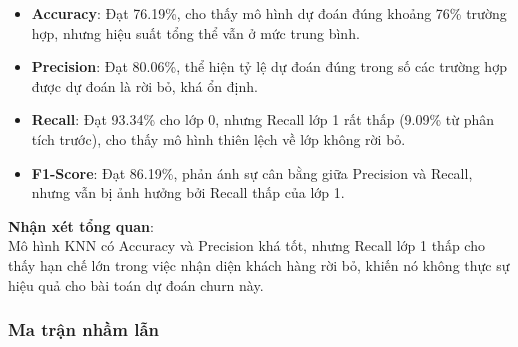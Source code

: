 \documentclass[
]{article}
\newenvironment{Shaded}{\begin{snugshade}}{\end{snugshade}}
\newcommand{\AttributeTok}[1]{\textcolor[rgb]{0.13,0.29,0.53}{#1}}
\newcommand{\FunctionTok}[1]{\textcolor[rgb]{0.13,0.29,0.53}{\textbf{#1}}}
\newcommand{\NormalTok}[1]{#1}
\newcommand{\OtherTok}[1]{\textcolor[rgb]{0.56,0.35,0.01}{#1}}
\newcommand{\SpecialCharTok}[1]{\textcolor[rgb]{0.81,0.36,0.00}{\textbf{#1}}}
\newcommand{\StringTok}[1]{\textcolor[rgb]{0.31,0.60,0.02}{#1}}
\providecommand{\tightlist}{%
  \setlength{\itemsep}{0pt}\setlength{\parskip}{0pt}}
\begin{document}
\begin{itemize}
\tightlist
\item
  \textbf{Accuracy}: Đạt 76.19\%, cho thấy mô hình dự đoán đúng khoảng
  76\% trường hợp, nhưng hiệu suất tổng thể vẫn ở mức trung bình.
\item
  \textbf{Precision}: Đạt 80.06\%, thể hiện tỷ lệ dự đoán đúng trong số
  các trường hợp được dự đoán là rời bỏ, khá ổn định.
\item
  \textbf{Recall}: Đạt 93.34\% cho lớp 0, nhưng Recall lớp 1 rất thấp
  (9.09\% từ phân tích trước), cho thấy mô hình thiên lệch về lớp không
  rời bỏ.
\item
  \textbf{F1-Score}: Đạt 86.19\%, phản ánh sự cân bằng giữa Precision và
  Recall, nhưng vẫn bị ảnh hưởng bởi Recall thấp của lớp 1.
\end{itemize}

\textbf{Nhận xét tổng quan}:\\
Mô hình KNN có Accuracy và Precision khá tốt, nhưng Recall lớp 1 thấp
cho thấy hạn chế lớn trong việc nhận diện khách hàng rời bỏ, khiến nó
không thực sự hiệu quả cho bài toán dự đoán churn này.

\subsubsection{Ma trận nhầm lẫn}\label{sec-knn-cm}

\begin{Shaded}
\end{Shaded}
\end{document}
